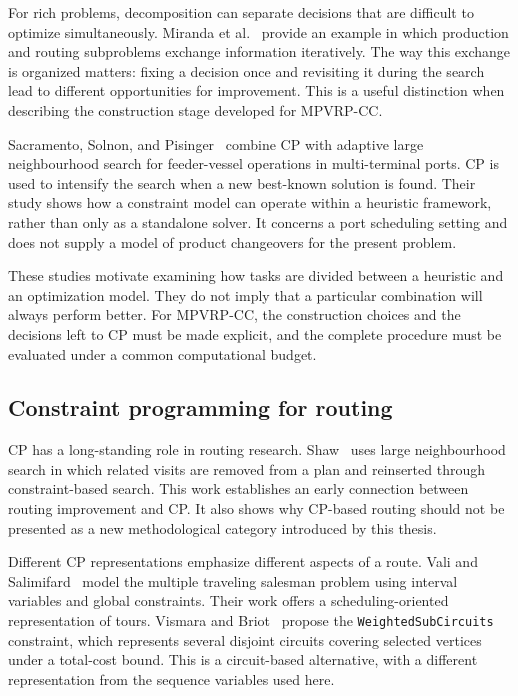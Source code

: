 For rich problems, decomposition can separate decisions that are difficult
to optimize simultaneously. Miranda et al.~\cite{MIRANDA2018211} provide an
example in which production and routing subproblems exchange information
iteratively. The way this exchange is organized matters: fixing a decision
once and revisiting it during the search lead to different opportunities for
improvement. This is a useful distinction when describing the construction
stage developed for MPVRP-CC.

Sacramento, Solnon, and Pisinger~\cite{sacramento2020feeder} combine CP with
adaptive large neighbourhood search for feeder-vessel operations in
multi-terminal ports. CP is used to intensify the search when a new
best-known solution is found. Their study shows how a constraint model can
operate within a heuristic framework, rather than only as a standalone
solver. It concerns a port scheduling setting and does not supply a model
of product changeovers for the present problem.

These studies motivate examining how tasks are divided between a heuristic
and an optimization model. They do not imply that a particular combination
will always perform better. For MPVRP-CC, the construction choices and the
decisions left to CP must be made explicit, and the complete procedure must
be evaluated under a common computational budget.

\subsection{Constraint programming for routing}

CP has a long-standing role in routing research. Shaw~\cite{shaw1998constraint}
uses large neighbourhood search in which related visits are removed from a
plan and reinserted through constraint-based search. This work establishes
an early connection between routing improvement and CP. It also shows why
CP-based routing should not be presented as a new methodological category
introduced by this thesis.

Different CP representations emphasize different aspects of a route.
Vali and Salimifard~\cite{vali2017mtsp} model the multiple traveling salesman
problem using interval variables and global constraints. Their work offers
a scheduling-oriented representation of tours. Vismara and
Briot~\cite{vismara2018circuit} propose the \texttt{WeightedSubCircuits}
constraint, which represents several disjoint circuits covering selected
vertices under a total-cost bound. This is a circuit-based alternative,
with a different representation from the sequence variables used here.


